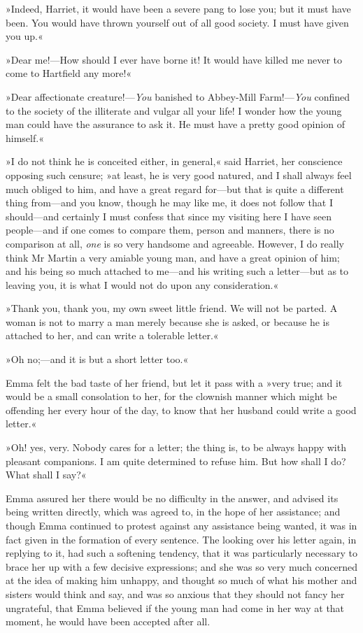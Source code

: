 »Indeed, Harriet, it would have been a severe pang to lose you; but it must have been. You would have thrown yourself out of all good society. I must have given you up.«

»Dear me!—How should I ever have borne it! It would have killed me never to come to Hartfield any more!«

»Dear affectionate creature!—\textit{You} banished to Abbey-Mill Farm!—\textit{You} confined to the society of the illiterate and vulgar all your life! I wonder how the young man could have the assurance to ask it. He must have a pretty good opinion of himself.«

»I do not think he is conceited either, in general,« said Harriet, her conscience opposing such censure; »at least, he is very good natured, and I shall always feel much obliged to him, and have a great regard for—but that is quite a different thing from—and you know, though he may like me, it does not follow that I should—and certainly I must confess that since my visiting here I have seen people—and if one comes to compare them, person and manners, there is no comparison at all, \textit{one} is so very handsome and agreeable. However, I do really think Mr Martin a very amiable young man, and have a great opinion of him; and his being so much attached to me—and his writing such a letter—but as to leaving you, it is what I would not do upon any consideration.«

»Thank you, thank you, my own sweet little friend. We will not be parted. A woman is not to marry a man merely because she is asked, or because he is attached to her, and can write a tolerable letter.«

»Oh no;—and it is but a short letter too.«

Emma felt the bad taste of her friend, but let it pass with a »very true; and it would be a small consolation to her, for the clownish manner which might be offending her every hour of the day, to know that her husband could write a good letter.«

»Oh! yes, very. Nobody cares for a letter; the thing is, to be always happy with pleasant companions. I am quite determined to refuse him. But how shall I do? What shall I say?«

Emma assured her there would be no difficulty in the answer, and advised its being written directly, which was agreed to, in the hope of her assistance; and though Emma continued to protest against any assistance being wanted, it was in fact given in the formation of every sentence. The looking over his letter again, in replying to it, had such a softening tendency, that it was particularly necessary to brace her up with a few decisive expressions; and she was so very much concerned at the idea of making him unhappy, and thought so much of what his mother and sisters would think and say, and was so anxious that they should not fancy her ungrateful, that Emma believed if the young man had come in her way at that moment, he would have been accepted after all.

